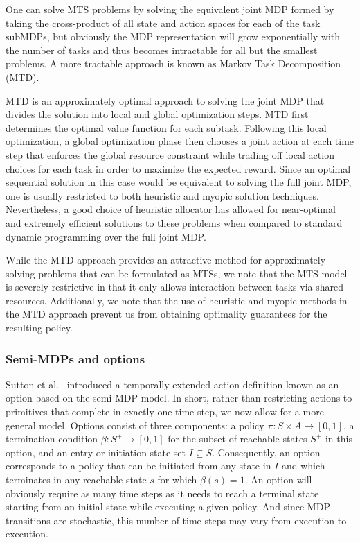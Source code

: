 One can solve MTS problems by solving the equivalent joint MDP formed by
taking the cross-product of all state and action spaces for each
of the task subMDPs, but obviously
the MDP representation will grow exponentially with the number of tasks and
thus becomes intractable for all but the smallest problems.  
A more tractable approach is known as Markov Task Decomposition (MTD).

MTD is an approximately optimal approach to solving the joint MDP that
divides the solution into local and global optimization steps.  MTD
first determines the optimal value function for each subtask.
Following this local optimization, a global optimization phase then
chooses a joint action at each time step that enforces the global
resource constraint while trading off local action choices for each
task in order to maximize the expected reward.  Since an optimal
sequential solution in this case would be equivalent to solving the
full joint MDP, one is usually restricted to both heuristic and myopic
solution techniques.  Nevertheless, a good
choice of heuristic allocator has allowed for near-optimal and
extremely efficient solutions to these problems when compared to
standard dynamic programming over the full joint MDP.

While the MTD approach provides an attractive method for approximately 
solving problems that can be formulated as MTSs, we note
that the MTS model is severely restrictive in that it only allows interaction
between tasks via shared resources.  
Additionally, we note that the use of heuristic and myopic methods in the
MTD approach prevent us from obtaining optimality guarantees for the resulting
policy.

\subsubsection{Semi-MDPs and options}

Sutton et al.~\cite{smdp} introduced a temporally extended action
definition known as an option based on the semi-MDP model.  In short,
rather than restricting actions to primitives that complete in exactly
one time step, we now allow for a more general model.  Options consist
of three components: a policy $\pi: S \times A \rightarrow [0,1]$, a
termination condition $\beta: S^+ \rightarrow [0,1]$ for the subset of
reachable states $S^+$ in this option, and an entry or initiation state set
$I \subseteq S$.  Consequently, an option corresponds to a policy that
can be initiated from any state in $I$ and which terminates in any
reachable state $s$ for which $\beta(s) = 1$.  An option
will obviously require as many time steps as it needs to reach a
terminal state starting from an initial state while executing a given
policy. And since MDP transitions are stochastic, this number of time steps
may vary from execution to execution.

